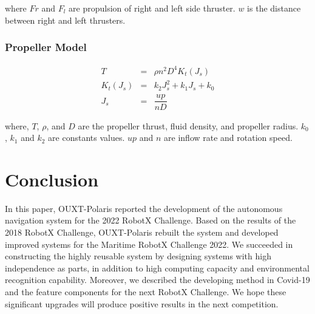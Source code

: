\documentclass[lettersize,journal]{IEEEtran}
\begin{document}
where $Fr$ and $F_l$ are propulsion of right and left side thruster.
$w$ is the distance between right and left thrusters.


\subsubsection{Propeller Model}
\begin{eqnarray}
T &=& \rho n^2 D^4 K_t(J_s)\\
K_t(J_s) &=& k_2J_s^2 + k_1J_s + k_0\\
J_s &=& \dfrac{up}{nD}
\end{eqnarray}

where,
$T$, $\rho$, and $D$ are the propeller thrust, fluid density, and propeller radius.
$k_0$, $k_1$ and $k_2$ are constants values.
$up$ and $n$ are inflow rate and rotation speed.


\section{Conclusion}
In this paper, OUXT-Polaris reported the development of the autonomous navigation system for the 2022 RobotX Challenge.
Based on the results of the 2018 RobotX Challenge, OUXT-Polaris rebuilt the system and
developed improved systems for the Maritime RobotX Challenge 2022.
We succeeded in constructing the highly reusable system by designing systems with high independence as parts,
in addition to high computing capacity and environmental recognition capability.
Moreover, we described the developing method in Covid-19 and the feature components for the next RobotX Challenge.
We hope these significant upgrades will produce positive results in the next competition.
\end{document}
